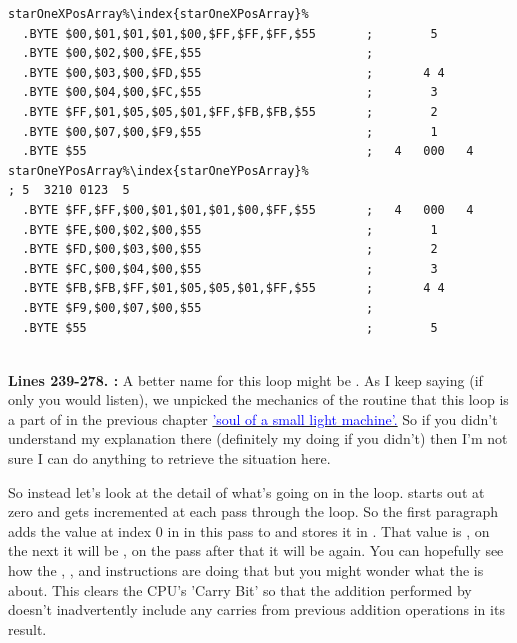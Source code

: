 \begin{lstlisting}[escapechar=\%]
starOneXPosArray%\index{starOneXPosArray}%
  .BYTE $00,$01,$01,$01,$00,$FF,$FF,$FF,$55       ;        5       
  .BYTE $00,$02,$00,$FE,$55                       ;                
  .BYTE $00,$03,$00,$FD,$55                       ;       4 4      
  .BYTE $00,$04,$00,$FC,$55                       ;        3       
  .BYTE $FF,$01,$05,$05,$01,$FF,$FB,$FB,$55       ;        2       
  .BYTE $00,$07,$00,$F9,$55                       ;        1       
  .BYTE $55                                       ;   4   000   4  
starOneYPosArray%\index{starOneYPosArray}%                                  ; 5  3210 0123  5
  .BYTE $FF,$FF,$00,$01,$01,$01,$00,$FF,$55       ;   4   000   4  
  .BYTE $FE,$00,$02,$00,$55                       ;        1       
  .BYTE $FD,$00,$03,$00,$55                       ;        2       
  .BYTE $FC,$00,$04,$00,$55                       ;        3       
  .BYTE $FB,$FB,$FF,$01,$05,$05,$01,$FF,$55       ;       4 4      
  .BYTE $F9,$00,$07,$00,$55                       ;                
  .BYTE $55                                       ;        5       
                                                  
\end{lstlisting}
\clearpage

\textbf{Lines 239-278. :} A better name for this loop might be . As I keep saying (if only you would listen), we unpicked the mechanics
of the  routine that this loop is a
part of in the previous chapter
\hyperref[sec:listing_pattern]{\textcolor{blue}{'soul of a small light machine'.}} 
So if you didn't understand my explanation there (definitely my
doing if you didn't)
then I'm not sure I can do anything to retrieve the situation here.

So instead let's look at the detail of what's going on in the loop.  starts out at zero and gets incremented at
each pass through the loop. So the first paragraph adds the value at index 0 in  in this pass to 
and stores it in . That value is , on the next it will be , on the pass after that
it will be  again. You can hopefully see how the , , and  instructions are doing that
but you might wonder what the  is about. This clears the CPU's 'Carry Bit' so that the addition performed by 
doesn't inadvertently include any carries from previous addition operations in its result.

